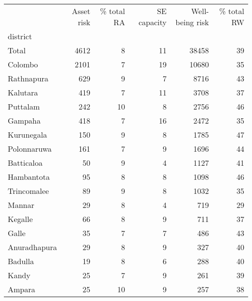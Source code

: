 \begin{tabular}{lrrrrr}
\toprule
{} &  Asset risk &  \% total RA &  SE capacity &  Well-being risk &  \% total RW \\
district     &             &             &              &                  &             \\
\midrule
Total        &        4612 &           8 &           11 &            38458 &          39 \\
Colombo      &        2101 &           7 &           19 &            10680 &          35 \\
Rathnapura   &         629 &           9 &            7 &             8716 &          43 \\
Kalutara     &         419 &           7 &           11 &             3708 &          37 \\
Puttalam     &         242 &          10 &            8 &             2756 &          46 \\
Gampaha      &         418 &           7 &           16 &             2472 &          35 \\
Kurunegala   &         150 &           9 &            8 &             1785 &          47 \\
Polonnaruwa  &         161 &           7 &            9 &             1696 &          44 \\
Batticaloa   &          50 &           9 &            4 &             1127 &          41 \\
Hambantota   &          95 &           8 &            8 &             1098 &          46 \\
Trincomalee  &          89 &           9 &            8 &             1032 &          35 \\
Mannar       &          29 &           8 &            4 &              719 &          29 \\
Kegalle      &          66 &           8 &            9 &              711 &          37 \\
Galle        &          35 &           7 &            7 &              486 &          43 \\
Anuradhapura &          29 &           8 &            9 &              327 &          40 \\
Badulla      &          19 &           8 &            6 &              288 &          40 \\
Kandy        &          25 &           7 &            9 &              261 &          39 \\
Ampara       &          25 &          10 &            9 &              257 &          38 \\

\end{tabular}
